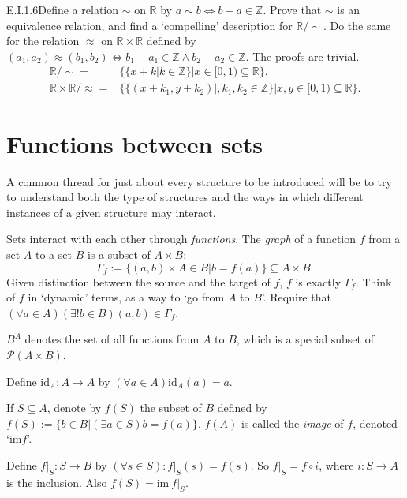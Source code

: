 \begin{exercise}{E.I.1.6}{Define a relation $\sim$ on $\mathbb{R}$ by $a\sim b \Leftrightarrow b-a\in\mathbb{Z}$. Prove that $\sim$ is an equivalence relation, and find a `compelling' description for $\mathbb{R}/\sim$. Do the same for the relation $\approx$ on $\mathbb{R}\times\mathbb{R}$ defined by $(a_1, a_2)\approx(b_1, b_2)\Leftrightarrow b_1-a_1\in\mathbb{Z}\wedge b_2-a_2\in\mathbb{Z}.$}
  The proofs are trivial.
  \begin{align*}
    \mathbb{R}/\sim=                     & \{\{x+k|k\in \mathbb{Z}\}|x\in[0,1)\subseteq\mathbb{R}\}.                      \\
    \mathbb{R}\times \mathbb{R}/\approx= & \{\{(x+k_1,y+k_2)|, k_1,k_2\in \mathbb{Z}\}|x,y\in[0,1)\subseteq \mathbb{R}\}.
  \end{align*}
\end{exercise}

\section{Functions between sets}

A common thread for just about every structure to be introduced will be to try to understand both the type of structures and the ways in which diﬀerent instances of a given structure may interact.

Sets interact with each other through \textit{functions}. The \textit{graph} of a function $f$ from a set $A$ to a set $B$ is a subset of $A\times B$:
\[
  \Gamma_f:=\{(a,b)\times A\in B|b=f(a)\}\subseteq A\times B.
\]
Given distinction between the source and the target of $f$, $f$ is exactly $\Gamma_f$. Think of $f$ in `dynamic' terms, as a way to `go from $A$ to $B$'. Require that $(\forall a\in A)(\exists !b\in B)(a,b)\in \Gamma_f$.

$B^A$ denotes the set of all functions from $A$ to $B$, which is a special subset of $\mathcal{P}(A\times B)$.

Define $\mathrm{id}_A:A\rightarrow A$ by $(\forall a\in A)\mathrm{id}_A(a)=a$.

If $S\subseteq A$, denote by $f(S)$ the subset of $B$ defined by $f(S):=\{b\in B|(\exists a\in S)b=f(a)\}$. $f(A)$ is called the \textit{image} of $f$, denoted `$\mathrm{im}f$'.

Define $f|_{S}:S\rightarrow B$ by $(\forall s\in S):f|_{S}(s)=f(s)$. So $f|_S=f\circ i$, where $i:S\rightarrow A$ is the inclusion. Also $f(S)=\mathrm{im}\ f|_S$.

